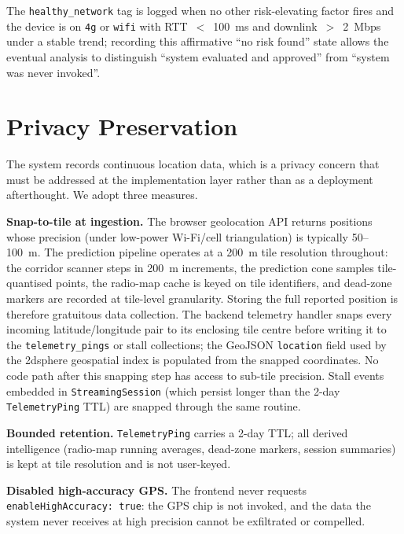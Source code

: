 \documentclass[conference]{IEEEtran}
\begin{document}
The \texttt{healthy\_network} tag is logged when no other risk-elevating
factor fires and the device is on \texttt{4g} or \texttt{wifi} with
RTT~$<$~100~ms and downlink~$>$~2~Mbps under a stable trend; recording
this affirmative ``no risk found'' state allows the eventual analysis to
distinguish ``system evaluated and approved'' from ``system was never
invoked''.

\section{Privacy Preservation}
\label{sec:privacy}
The system records continuous location data, which is a privacy concern
that must be addressed at the implementation layer rather than as a
deployment afterthought. We adopt three measures.

\textbf{Snap-to-tile at ingestion.} The browser geolocation API returns
positions whose precision (under low-power Wi-Fi/cell triangulation) is
typically 50--100~m. The prediction pipeline operates at a 200~m tile
resolution throughout: the corridor scanner steps in 200~m increments,
the prediction cone samples tile-quantised points, the radio-map cache
is keyed on tile identifiers, and dead-zone markers are recorded at
tile-level granularity. Storing the full reported position is therefore
gratuitous data collection. The backend telemetry handler snaps every
incoming latitude/longitude pair to its enclosing tile centre before
writing it to the \texttt{telemetry\_pings} or stall collections; the
GeoJSON \texttt{location} field used by the 2dsphere geospatial index is
populated from the snapped coordinates. No code path after this
snapping step has access to sub-tile precision. Stall events embedded
in \texttt{StreamingSession} (which persist longer than the 2-day
\texttt{TelemetryPing} TTL) are snapped through the same routine.

\textbf{Bounded retention.} \texttt{TelemetryPing} carries a 2-day TTL;
all derived intelligence (radio-map running averages, dead-zone markers,
session summaries) is kept at tile resolution and is not user-keyed.

\textbf{Disabled high-accuracy GPS.} The frontend never requests
\texttt{enableHighAccuracy: true}: the GPS chip is not invoked, and the
data the system never receives at high precision cannot be exfiltrated
or compelled.
\end{document}
